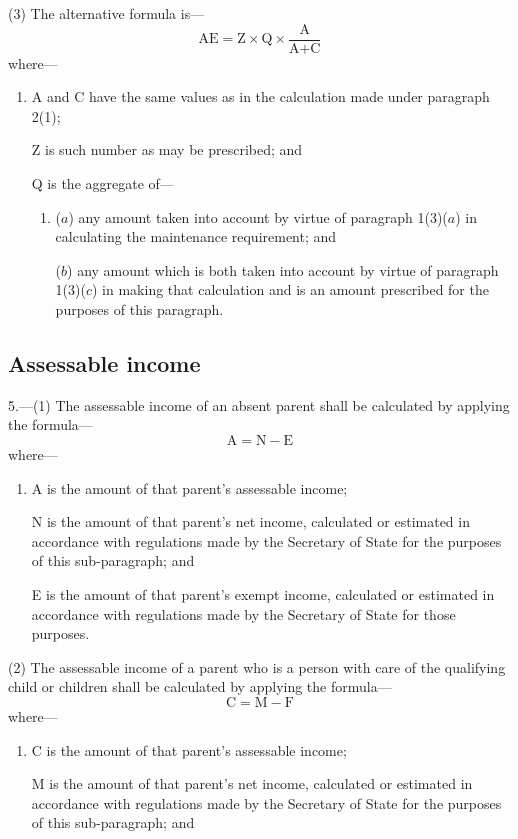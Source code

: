 \documentclass[a4paper]{article}
\begin{document}
{(3) The alternative formula is---
\[
\textrm{AE} = \textrm{Z} \times \textrm{Q} \times \frac{\textrm{A}}{\textrm{A} + \textrm{C}}
\]
where---
\begin{enumerate}\item[]
A and C have the same values as in the calculation made under paragraph 2(1);

Z is such number as may be prescribed; and

Q is the aggregate of---
\begin{enumerate}\item[]
($a$) any amount taken into account by virtue of paragraph 1(3)($a$) in calculating the maintenance requirement; and

($b$) any amount which is both taken into account by virtue of paragraph 1(3)($c$) in making that calculation and is an amount prescribed for the purposes of this paragraph.
\end{enumerate}
\end{enumerate}

\subsection*{Assessable income}

5.---(1) The assessable income of an absent parent shall be calculated by applying the formula---
\[\textrm{A} = \textrm{N} - \textrm{E}\]
where---
\begin{enumerate}\item[]
A is the amount of that parent’s assessable income;

N is the amount of that parent’s net income, calculated or estimated in accordance with regulations made by the Secretary of State for the purposes of this sub-paragraph; and

E is the amount of that parent’s exempt income, calculated or estimated in accordance with regulations made by the Secretary of State for those purposes.
\end{enumerate}


(2) The assessable income of a parent who is a person with care of the qualifying child or children shall be calculated by applying the formula---
\[
\textrm{C} = \textrm{M} - \textrm{F}
\]
where---
\begin{enumerate}\item[]
C is the amount of that parent’s assessable income;

M is the amount of that parent’s net income, calculated or estimated in accordance with regulations made by the Secretary of State for the purposes of this sub-paragraph; and


\end{enumerate}}
\end{document}
